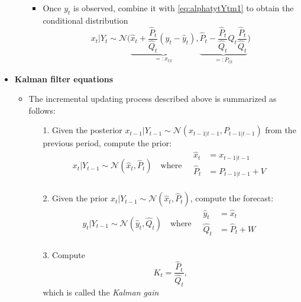 \documentclass[12pt,a4paper]{article}
\begin{document}
\begin{itemize}
\begin{itemize}
\begin{itemize}
    \item Once $y_{t}$ is observed,
      combine it with \eqref{eq:alphatytYtm1}
      to obtain the conditional
      distribution
      \begin{equation}
        x_{t}|Y_{t}
        \sim
        \mathcal{N} \bigg(
        \underbrace{\hat{x}_{t} + \frac{\hat{P}_{t}}{\hat{Q}_{t}}(y_{t}-\hat{y}_{t})}_{=:x_{t|t}},
        \underbrace{\hat{P}_{t} - \frac{\hat{P}_{t}}{\hat{Q}_{t}}\hat{Q}_{t}\frac{\hat{P}_{t}}{\hat{Q}_{t}}}_{=:P_{t|t}}
        \bigg)
        \nonumber
      \end{equation}

    \end{itemize}

  \end{itemize}

\item \textbf{Kalman filter equations}

  \begin{itemize}

  \item The incremental updating process described above is summarized as follows:
    \begin{itemize}

    \item[1.] Given the posterior $x_{t-1}|Y_{t-1}\sim \mathcal{N}(x_{t-1|t-1},P_{t-1|t-1})$ from the previous period,
      compute the prior:
      \begin{equation}\label{eq:KFE_atAt_local}%
        x_{t}|Y_{t-1}\sim \mathcal{N}(\hat{x}_{t},\hat{P}_{t})
        \quad\text{where}\quad
        \begin{aligned}
          \hat{x}_{t} & = x_{t-1|t-1} \\
          \hat{P}_{t} & = P_{t-1|t-1} + V \\
        \end{aligned}
      \end{equation}

    \item[2.] Given the prior $x_{t}|Y_{t-1}\sim \mathcal{N}(\hat{x}_{t},\hat{P}_{t})$,
      compute the forecast:
      \begin{equation}\label{eq:KFE_ftFt_local}%
        y_{t}|Y_{t-1}\sim \mathcal{N}(\hat{y}_{t},\hat{Q}_{t})
        \quad\text{where}\quad
        \begin{aligned}
          \hat{y}_{t} & = \hat{x}_{t} \\
          \hat{Q}_{t} & = \hat{P}_{t} + W \\
        \end{aligned}
      \end{equation}
    \item[3.] Compute
      \begin{equation}\label{eq:KFE_Kt_local}%
        K_{t} = \frac{\hat{P}_{t}}{\hat{Q}_{t}},
      \end{equation}
      which is called the \emph{Kalman gain}


\end{itemize}
\end{itemize}
\end{itemize}
\end{document}
